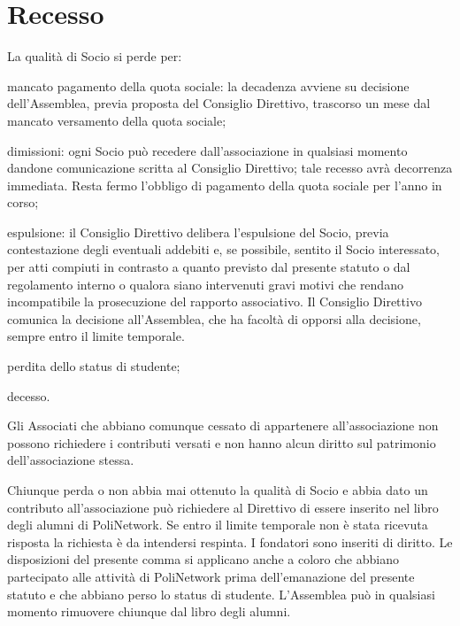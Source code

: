 \documentclass[legalpaper, 11pt]{exam}
\let\tempone\enumerate
\let\temptwo\endenumerate
\renewenvironment{enumerate}{\tempone\addtolength{\itemsep}{-0.45\baselineskip}}{\temptwo}
\begin{document}
{\section{Recesso}
\begin{enumerate}
 \item La qualità di Socio si perde per:
 \vspace{-5pt}
 \begin{enumerate}
  \item mancato pagamento della quota sociale: la decadenza avviene su decisione dell’Assemblea, previa proposta del Consiglio Direttivo, trascorso un mese dal mancato versamento della quota sociale;
  \item dimissioni: ogni Socio può recedere dall’associazione in qualsiasi momento dandone comunicazione scritta al Consiglio Direttivo; tale recesso avrà decorrenza immediata. Resta fermo l’obbligo di pagamento della quota sociale per l’anno in corso;
  \item espulsione: il Consiglio Direttivo delibera l’espulsione del Socio, previa contestazione degli eventuali addebiti e, se possibile, sentito il Socio interessato, per atti compiuti in contrasto a quanto previsto dal presente statuto o dal regolamento interno o qualora siano intervenuti gravi motivi che rendano incompatibile la prosecuzione del rapporto associativo. Il Consiglio Direttivo comunica la decisione all’Assemblea, che ha facoltà di opporsi alla decisione, sempre entro il limite temporale.
  \item perdita dello status di studente;
  \item decesso.
 \end{enumerate}

 \item Gli Associati che abbiano comunque cessato di appartenere all’associazione non possono richiedere i contributi versati e non hanno alcun diritto sul patrimonio dell’associazione stessa.
 \item Chiunque perda o non abbia mai ottenuto la qualità di Socio e abbia dato un contributo all’associazione può richiedere al Direttivo di essere inserito nel libro degli alumni di PoliNetwork. Se entro il limite temporale non è stata ricevuta risposta la richiesta è da intendersi respinta. I fondatori sono inseriti di diritto. Le disposizioni del presente comma si applicano anche a coloro che abbiano partecipato alle attività di PoliNetwork prima dell’emanazione del presente statuto e che abbiano perso lo status di studente. L'Assemblea può in qualsiasi momento rimuovere chiunque dal libro degli alumni.
\end{enumerate}

}
\end{document}
